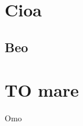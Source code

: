\documentclass[11pt, a4paper]{article}
\begin{document}
\section{Cioa}
\subsection{Beo}
\section{TO mare}
Omo
\end{document}
